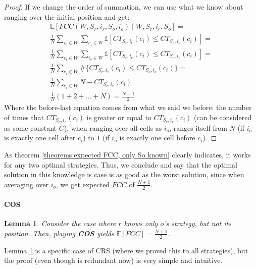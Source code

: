 \documentclass[a4paper,10pt]{article}
\newtheorem{lemma}[theorem]{Lemma}
\newcommand\rob{\ensuremath{r}\xspace}
\newcommand\opp{\ensuremath{o}\xspace}
\newcommand{\fcc}{\ensuremath{FCC}\xspace}
\begin{document}
\begin{proof}
If we change the order of summation, we can use what we know about ranging over the initial position and get:
\begin{multline*}
\mathbb{E}\left[\fcc\left(W, S_{\rob}, i_r, S_{\opp}, i_{\opp}\right) \mid W, S_{\rob}, i_r, S_{\opp}\right]=\\
\frac{1}{N}\sum_{i_{\opp}\in W}{\sum_{c_i\in W}{\mathds{1}\left[CT_{S_{\rob},i_r}(c_i) \le CT_{S_{\opp},i_{\opp}}(c_i)\right]}}= \\
\frac{1}{N}\sum_{c_i\in W}{\sum_{i_{\opp}\in W}{\mathds{1}\left[CT_{S_{\rob},i_r}(c_i) \le CT_{S_{\opp},i_{\opp}}(c_i)\right]}}=\\
\frac{1}{N}\sum_{c_i\in W}{\# \lbrace CT_{S_{\rob},i_r}(c_i) \le CT_{S_{\opp},i_{\opp}}(c_i)\rbrace}=\\
\frac{1}{N}\sum_{c_i\in W}{N-CT_{S_{\rob},i_r}(c_i)}=\\
\frac{1}{N}(1+2+\ldots+N)=\frac{N+1}{2}
\end{multline*}
Where the before-last equation comes from what we said we before: the number of times that $CT_{S_{\opp},i_{\opp}}(c_i)$ is greater or equal to $CT_{S_{\rob},i_r}(c_i)$ (can be considered as some constant $C$), when ranging over all cells as $i_{\opp}$, ranges itself from $N$ (if $i_{\opp}$ is exactly one cell after $c_i$) to $1$ (if $i_{\opp}$ is exactly one cell before $c_i$).


\end{proof}
As theorem \ref{theorems:expected FCC, only So known} clearly indicates, it works for any two optimal strategies. Thus, we conclude and say that the optimal solution in this knowledge is case is as good as the worst solution, since when averaging over $i_{\opp}$, we get expected \fcc of $\frac{N+1}{2}$.

\paragraph*{COS}

\begin{lemma}\label{theorems: only So is known, COS, EFCC}
Consider the case where \rob knows only \opp's strategy, but not its position. Then, playing \textbf{COS} yields $\mathbb{E}\left[\fcc\right]=\frac{N+1}{2}$.
\end{lemma}

Lemma \ref{theorems: only So is known, COS, EFCC} is a specific case of CRS (where we proved this to all strategies), but the proof (even though is redundant now) is very simple and intuitive.
\end{document}
